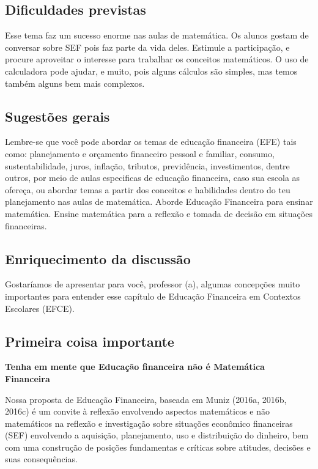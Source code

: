 \begin{apresentacao}
\subsection{Dificuldades previstas} Esse tema faz um sucesso enorme nas aulas de matemática. Os alunos gostam de conversar sobre SEF pois faz parte da vida deles. Estimule a participação, e procure aproveitar o interesse para trabalhar os conceitos matemáticos. O uso de calculadora pode ajudar, e muito, pois alguns cálculos são simples, mas temos também alguns bem mais complexos. 

\subsection{Sugestões gerais} Lembre-se que você pode abordar os temas de educação financeira (EFE) tais como: planejamento e orçamento financeiro pessoal e familiar, consumo, sustentabilidade, juros, inflação, tributos, previdência, investimentos, dentre outros, por meio de aulas especificas de educação financeira, caso sua escola as ofereça, ou abordar temas a partir dos conceitos e habilidades dentro do teu planejamento nas aulas de matemática. Aborde Educação Financeira para ensinar matemática. Ensine matemática para a reflexão e tomada de decisão em situações financeiras.

\subsection*{Enriquecimento da discussão}

Gostaríamos de apresentar para você, professor (a), algumas concepções muito importantes para entender esse capítulo de Educação Financeira em Contextos Escolares (EFCE). 

\subsection{Primeira coisa importante}
\begin{center}
\textbf{Tenha em mente que Educação financeira não é Matemática Financeira}
\end{center}
Nossa proposta de Educação Financeira, baseada em Muniz (2016a, 2016b, 2016c) é um convite à reflexão envolvendo aspectos matemáticos e não matemáticos na reflexão e investigação sobre situações econômico financeiras (SEF) envolvendo a aquisição, planejamento, uso e distribuição do dinheiro, bem com uma construção de posições fundamentas e críticas sobre atitudes, decisões e suas consequências. 


\end{apresentacao}
